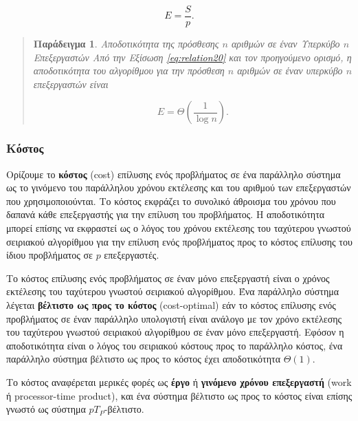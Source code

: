 \documentclass[12pt,a4paper]{article}
\newtheorem{paradeigma}{Παράδειγμα}
\begin{document}
\begin{equation}
E = \frac{S}{p}.
\label{eq:relation21}
\end{equation}

\begin{quote}
\begin{paradeigma} \label{par:5} Αποδοτικότητα της πρόσθεσης $n$ αριθμών σε έναν Υπερκύβο $n$ Επεξεργαστών
Από την Εξίσωση \ref{eq:relation20} και τον προηγούμενο ορισμό, η 
αποδοτικότητα του αλγορίθμου για την πρόσθεση $n$ αριθμών σε έναν 
υπερκύβο $n$ επεξεργαστών είναι

\begin{equation}
E = \Theta \left(\frac{1}{\log n}\right).
\label{eq:relation22}
\end{equation}

\end{paradeigma}
\end{quote}

\subsubsection{Κόστος}
Ορίζουμε το \textbf{κόστος} ({\foreignlanguage{english}{cost}}) επίλυσης 
ενός προβλήματος σε ένα παράλληλο σύστημα ως το γινόμενο του παράλληλου 
χρόνου εκτέλεσης και του αριθμού των επεξεργαστών που χρησιμοποιούνται. 
Το κόστος εκφράζει το συνολικό άθροισμα του χρόνου που δαπανά κάθε 
επεξεργαστής για την επίλυση του προβλήματος. Η αποδοτικότητα μπορεί επίσης 
να εκφραστεί ως ο λόγος του χρόνου εκτέλεσης του ταχύτερου γνωστού σειριακού 
αλγορίθμου για την επίλυση ενός προβλήματος προς το κόστος επίλυσης του 
ίδιου προβλήματος σε $p$ επεξεργαστές.

Το κόστος επίλυσης ενός προβλήματος σε έναν μόνο επεξεργαστή είναι ο χρόνος 
εκτέλεσης του ταχύτερου γνωστού σειριακού αλγορίθμου. Ένα παράλληλο σύστημα 
λέγεται \textbf{βέλτιστο ως προς το κόστος} (\foreignlanguage{english}{cost-optimal}) 
εάν το κόστος επίλυσης ενός προβλήματος σε έναν παράλληλο υπολογιστή είναι 
ανάλογο με τον χρόνο εκτέλεσης του ταχύτερου γνωστού σειριακού αλγορίθμου 
σε έναν μόνο επεξεργαστή. Εφόσον η αποδοτικότητα είναι ο λόγος του σειριακού 
κόστους προς το παράλληλο κόστος, ένα παράλληλο σύστημα βέλτιστο ως προς το 
κόστος έχει αποδοτικότητα $\Theta(1)$.

Το κόστος αναφέρεται μερικές φορές ως \textbf{έργο} ή \textbf{γινόμενο χρόνου επεξεργαστή} 
(\foreignlanguage{english}{work} ή \foreignlanguage{english}{processor-time product}), 
και ένα σύστημα βέλτιστο ως προς το κόστος είναι επίσης γνωστό ως σύστημα $pT_P$-βέλτιστο.
\end{document}
